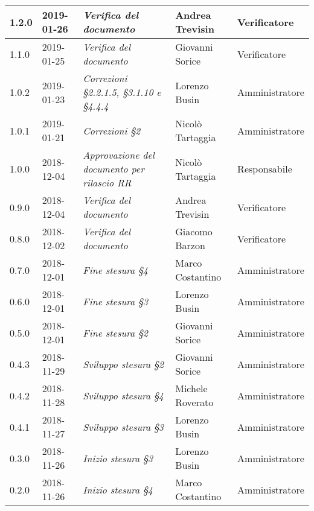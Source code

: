 \begin{longtable}{C{2cm}|C{2.5cm}|C{4.5cm}|C{2.5cm}|C{3cm}}
		1.2.0 & 2019-01-26 & \emph{Verifica del documento} & Andrea Trevisin & Verificatore  \\
		\hline
		
		1.1.0 & 2019-01-25 & \emph{Verifica del documento} & Giovanni Sorice & Verificatore  \\
		\hline
		
		1.0.2 & 2019-01-23 & \emph{Correzioni §2.2.1.5, §3.1.10 e §4.4.4} & Lorenzo Busin & Amministratore \\
		\hline
		
		1.0.1 & 2019-01-21 & \emph{Correzioni §2} & Nicolò Tartaggia & Amministratore  \\
		\hline
		
		1.0.0  & 2018-12-04 & \emph{Approvazione del documento per rilascio RR} & Nicolò Tartaggia & Responsabile \\
		\hline
		
		0.9.0 & 2018-12-04 &\emph{Verifica del documento} & Andrea Trevisin & Verificatore \\
		\hline
		
	    0.8.0 & 2018-12-02 & \emph{Verifica del documento} & Giacomo Barzon & Verificatore  \\
		\hline
		
		0.7.0 & 2018-12-01 & \emph{Fine stesura §4} & Marco Costantino & Amministratore  \\
		\hline
		
		0.6.0 & 2018-12-01 & \emph{Fine stesura §3} & Lorenzo Busin & Amministratore  \\
		\hline
		
	 	0.5.0 & 2018-12-01 & \emph{Fine stesura §2} & Giovanni Sorice & Amministratore  \\
		\hline
		
		0.4.3 & 2018-11-29 & \emph{Sviluppo stesura §2} & Giovanni Sorice & Amministratore  \\
		\hline
		
		0.4.2 & 2018-11-28 & \emph{Sviluppo stesura §4} & Michele Roverato & Amministratore  \\
		\hline
		
		 0.4.1 & 2018-11-27 &\emph{Sviluppo stesura §3} & Lorenzo Busin & Amministratore \\
		\hline
		
		0.3.0 & 2018-11-26 & \emph{Inizio stesura §3} & Lorenzo Busin & Amministratore  \\
		\hline
		
		0.2.0 & 2018-11-26 & \emph{Inizio stesura §4} & Marco Costantino & Amministratore  \\
		\hline
		

\end{longtable}
